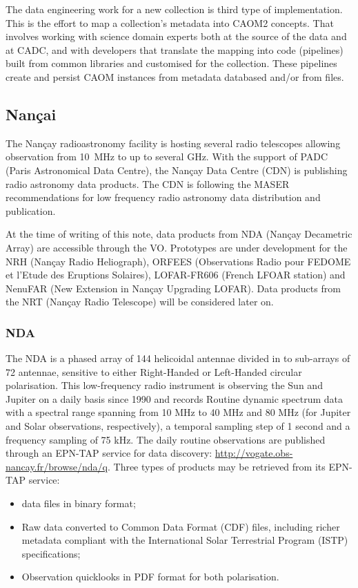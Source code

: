 \documentclass[11pt,a4paper]{ivoa}
\begin{document}
The data engineering work for a new collection is third type of implementation. This is the effort to 
map a collection's metadata into CAOM2 concepts. That involves working with science domain experts both 
at the source of the data and at CADC, and with developers that translate the mapping into code 
(pipelines) built from common libraries and customised for the collection. These pipelines create and 
persist CAOM instances from metadata databased and/or from files.

\subsection{Nan\c cai}
\label{sec:Nancay}

The Nan\c cay radioastronomy facility is hosting several radio telescopes allowing observation from 
10~MHz to up to several GHz. With the support of PADC (Paris Astronomical Data Centre), the Nan\c cay 
Data Centre (CDN) is publishing radio astronomy data products. The CDN is following the MASER \cite{10.5334/dsj-2020-012}
recommendations for low frequency radio astronomy data distribution and publication. 

At the time of writing of this note, data products from NDA (Nan\c cay Decametric Array) are accessible 
through the VO. Prototypes are under development for the NRH (Nan\c cay Radio Heliograph), ORFEES 
(Observations Radio pour FEDOME et l'Etude des Eruptions Solaires), LOFAR-FR606 (French LFOAR station) 
and NenuFAR (New Extension in Nan\c cay Upgrading LOFAR). Data products from the NRT (Nan\c cay Radio 
Telescope) will be considered later on. 


\subsubsection{NDA}
The NDA is a phased array of 144 helicoidal antennae divided in to sub-arrays of 72 antennae, sensitive 
to either Right-Handed or Left-Handed circular polarisation. This low-frequency radio instrument is
observing the Sun and Jupiter on a daily basis since 1990 and records Routine dynamic spectrum data with 
a spectral range spanning from 10 MHz to 40 MHz and 80 MHz (for Jupiter and Solar observations, 
respectively), a temporal sampling step of 1 second and a frequency sampling of 75 kHz. The daily 
routine observations are published through an EPN-TAP service for data discovery: 
\url{http://vogate.obs-nancay.fr/browse/nda/q}. Three types of products may be retrieved from its 
EPN-TAP service:
\begin{itemize}
\item data files in binary format;
\item Raw data converted to Common Data Format (CDF) files, including richer metadata compliant with the 
International Solar Terrestrial Program (ISTP) specifications;
\item Observation quicklooks in PDF format for both polarisation.
\end{itemize}
\end{document}

